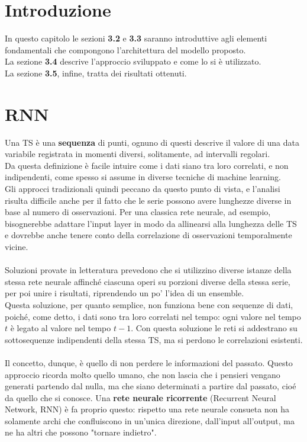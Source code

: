 \section{Introduzione}
In questo capitolo le sezioni \textbf{3.2} e \textbf{3.3} saranno introduttive agli elementi fondamentali che compongono l'architettura del modello proposto.\\
La sezione \textbf{3.4} descrive l'approccio sviluppato e come lo si è utilizzato.\\
La sezione \textbf{3.5}, infine, tratta dei risultati ottenuti.

\section{RNN}
Una TS è una \textbf{sequenza} di punti, ognuno di questi descrive il valore di una data variabile registrata in momenti diversi, solitamente, ad intervalli regolari.\\
Da questa definizione è facile intuire come i dati siano tra loro correlati, e non indipendenti, come spesso si assume in diverse tecniche di machine learning.\\
Gli approcci tradizionali quindi peccano da questo punto di vista, e l'analisi risulta difficile anche per il fatto che le serie possono avere lunghezze diverse in base al numero di osservazioni. Per una classica rete neurale, ad esempio, bisognerebbe adattare l'input layer in modo da allinearsi alla lunghezza delle TS e dovrebbe anche tenere conto della correlazione di osservazioni temporalmente vicine.\\
\\
Soluzioni provate in letteratura prevedono che si utilizzino diverse istanze della stessa rete neurale affinché ciascuna operi su porzioni diverse della stessa serie, per poi unire i risultati, riprendendo un po' l'idea di un ensemble.\\
Questa soluzione, per quanto semplice, non funziona bene con sequenze di dati, poiché, come detto, i dati sono tra loro correlati nel tempo: ogni valore nel tempo $t$ è legato al valore nel tempo $t-1$. Con questa soluzione le reti si addestrano su sottosequenze indipendenti della stessa TS, ma si perdono le correlazioni esistenti.\\
\\
Il concetto, dunque, è quello di non perdere le informazioni del passato. Questo approccio ricorda molto quello umano, che non lascia che i pensieri vengano generati partendo dal nulla, ma che siano determinati a partire dal passato, cioé da quello che si conosce. Una \textbf{rete neurale ricorrente} (Recurrent Neural Network, RNN) è fa proprio questo: rispetto una rete neurale consueta non ha solamente archi che confluiscono in un'unica direzione, dall'input all'output, ma ne ha altri che possono "tornare indietro".\\
